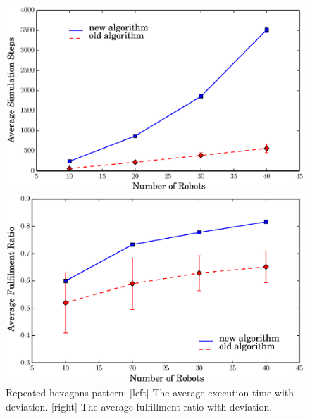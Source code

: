   \begin{figure}
  \centering 
    \begin{minipage}[b]{0.75\linewidth}
    \centering 
      \includegraphics[trim=0.5cm 0cm 1.5cm 0,clip=true,width=\linewidth]{figs/steps_hexagon}
    \end{minipage}
    \begin{minipage}[b]{0.75\linewidth}
    \centering 
      \includegraphics[trim=0.5cm 0 1.5cm 0,clip=true,width=\linewidth]{figs/ratio_hexagon}
    \end{minipage}
    \caption{Repeated hexagons pattern: [left] The average execution time with deviation. [right] The average fulfillment ratio with deviation.}
    \label{fig:hex_comp}
  \end{figure}
